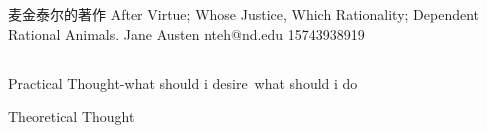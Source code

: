 

麦金泰尔的著作
    After Virtue; 
    Whose Justice, Which Rationality; 
    Dependent Rational Animals.
Jane Austen
nteh@nd.edu
15743938919

\subsection{}

Practical Thought-what should i desire\ what should i do

Theoretical Thought


